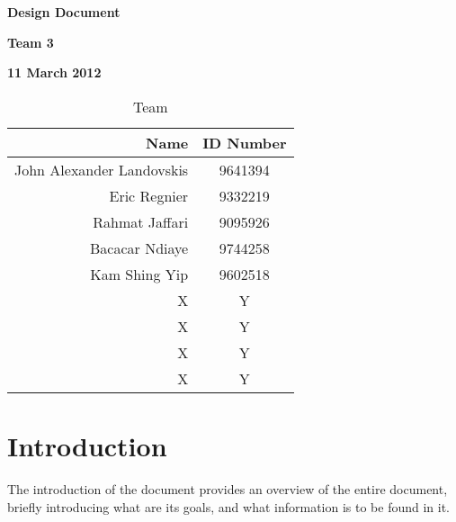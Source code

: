 \documentclass[12pt]{article}
\begin{document}
\vspace*{0.5in}
\centerline{\bf\Large Design Document}

\vspace*{0.5in}
\centerline{\bf\Large Team 3}

\vspace*{0.5in}
\centerline{\bf\Large 11 March 2012}

\vspace*{1.5in}
\begin{table}[htbp]
\caption{Team}
\begin{center}
\begin{tabular}{|r | c|}
\hline
Name & ID Number \\
\hline\hline
John Alexander Landovskis & 9641394\\
Eric Regnier & 9332219\\
Rahmat Jaffari & 9095926\\
Bacacar Ndiaye & 9744258\\
Kam Shing Yip & 9602518\\
X & Y\\
X & Y\\
X & Y\\
X & Y\\
\hline
\end{tabular}
\end{center}
\end{table}

\clearpage

\section{Introduction}

The introduction of the document provides an overview of the entire document,
briefly introducing what are its goals, and what information is to be found in it.






\end{document}
